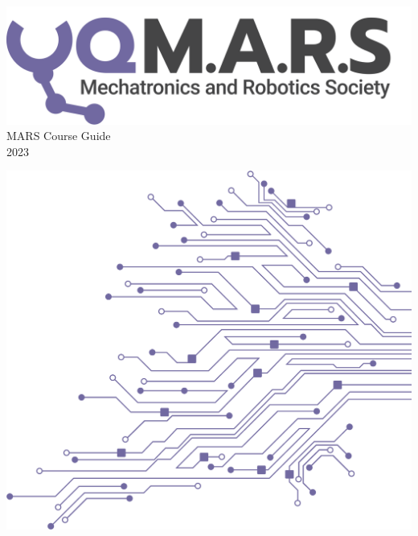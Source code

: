 \documentclass[a4paper,12pt]{report}
\begin{document}
\begin{titlepage}
    \begin{center}
        \vspace*{15mm}
        \includegraphics[width=0.7\paperwidth]{../Assets/Logo (Dark).png} \\
        \vspace{1cm}
        \Huge MARS Course Guide \\
        \huge \textcolor{turbo_purple}{2023}
    \end{center}
    \vfill
    \includegraphics[height=0.5\paperheight, right]{../Assets/Pattern - PCB (Solid).png}
    \vspace*{10mm}
\end{titlepage}
\restoregeometry
\newpage
\tableofcontents
\end{document}
